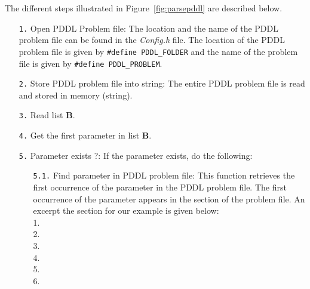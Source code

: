 The different steps illustrated in Figure~\ref{fig:parsepddl} are described below.
\begin{itemize}
\item[\texttt{1.}] Open PDDL Problem file: The location and the name of the PDDL problem file can be found in the \textit{Config.h} file. The location of the PDDL problem file is given by \texttt{\footnotesize{\#define PDDL\_FOLDER}} and the name of the problem file is given by \texttt{\footnotesize{\#define PDDL\_PROBLEM}}.
\item[\texttt{2.}] Store PDDL problem file into string: The entire PDDL problem file is read and stored in memory (string).
\item[\texttt{3.}] Read list \textbf{B}.
\item[\texttt{4.}] Get the first parameter in list \textbf{B}.
\item[\texttt{5.}] Parameter exists ?: If the parameter exists, do the following:
\begin{itemize}
\item[\texttt{5.1.}] Find parameter in PDDL problem file: This function retrieves the first occurrence of the parameter in the PDDL problem file. The first occurrence of the parameter appears in the  section of the problem file. An excerpt the  section for our example is given below:\\
{\scriptsize{1.}}\\
{\scriptsize{2.}}\hspace*{5mm}\\
{\scriptsize{3.}}\hspace*{5mm}\\
{\scriptsize{4.}}\hspace*{5mm}\\
{\scriptsize{5.}}\hspace*{5mm}\\
{\scriptsize{6.}}\planobj{)}



\end{itemize}
\end{itemize}
